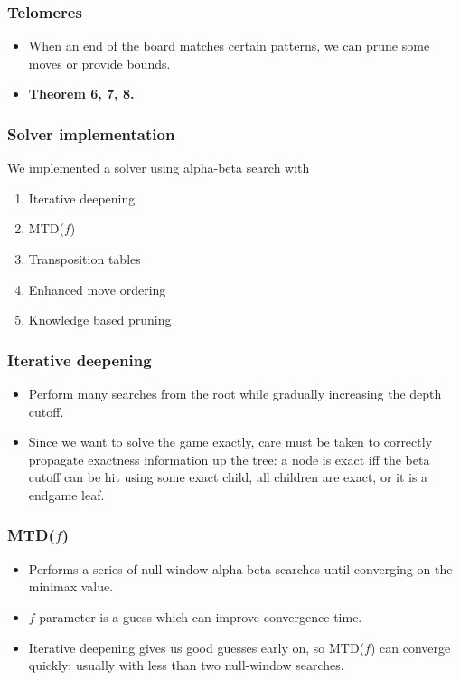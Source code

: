 \documentclass{beamer}
\begin{document}
    \begin{frame}
        \frametitle{Telomeres}
        \begin{itemize}
            \item When an end of the board matches certain patterns, we can prune some moves or provide bounds.
            \item \textbf{Theorem 6, 7, 8.}
        \end{itemize}
    \end{frame}

    \begin{frame}
        \frametitle{Solver implementation}
        We implemented a solver using alpha-beta search with
        \begin{enumerate}
            \item Iterative deepening
            \item MTD($f$)
            \item Transposition tables
            \item Enhanced move ordering
            \item Knowledge based pruning
        \end{enumerate}
    \end{frame}

    \begin{frame}
        \frametitle{Iterative deepening}
        \begin{itemize}
            \item Perform many searches from the root while gradually increasing the depth cutoff.
            \item Since we want to solve the game exactly, care must be taken to correctly propagate exactness
                information up the tree: a node is exact iff the beta cutoff can be hit using some exact child,
                all children are exact, or it is a endgame leaf.
        \end{itemize}
    \end{frame}

    \begin{frame}
        \frametitle{MTD($f$)}
        \begin{itemize}
            \item Performs a series of null-window alpha-beta searches until converging on the minimax value.
            \item $f$ parameter is a guess which can improve convergence time.
            \item Iterative deepening gives us good guesses early on, so MTD($f$) can converge quickly:
                usually with less than two null-window searches.
        \end{itemize}
    \end{frame}
\end{document}
